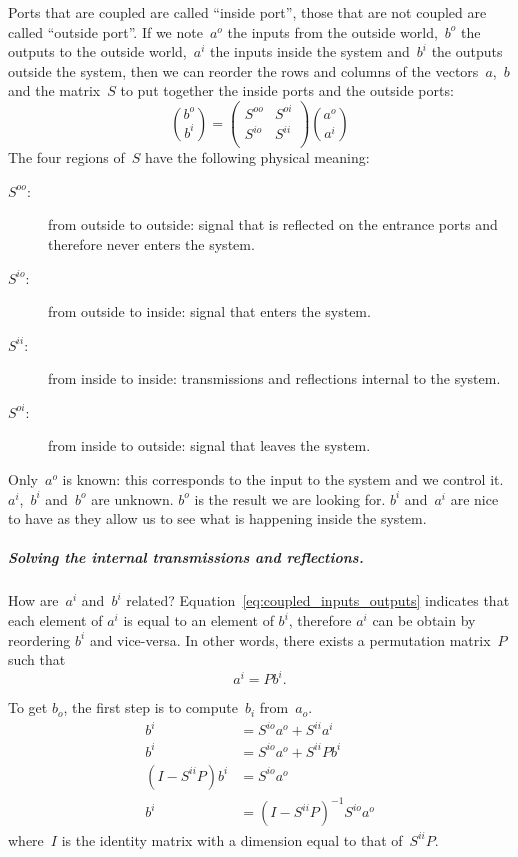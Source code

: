 Ports that are coupled are called ``inside port'', those that are not coupled are called ``outside port''.
If we note~$a^o$ the inputs from the outside world,~$b^o$ the outputs to the outside world,~$a^i$ the inputs inside the system and~$b^i$ the outputs outside the system, then we can reorder the rows and columns of the vectors~$a$,~$b$ and the matrix~$S$ to put together the inside ports and the outside ports: 
\begin{equation}
    \binom{b^o}{b^i} =
    \begin{pmatrix}
        S^{oo} & S^{oi} \\
        S^{io} & S^{ii} \\
    \end{pmatrix}
    \binom{a^o}{a^i}
    \label{eq:s_outside_inside}
\end{equation}
The four regions of~$S$ have the following physical meaning:
\begin{description}
    \item[$S^{oo}$:] from outside to outside: signal that is reflected on the entrance ports and therefore never enters the system.
    \item[$S^{io}$:] from outside to inside: signal that enters the system.
    \item[$S^{ii}$:] from inside to inside: transmissions and reflections internal to the system.
    \item[$S^{oi}$:] from inside to outside: signal that leaves the system.
\end{description}
Only~$a^o$ is known: this corresponds to the input to the system and we control it.
$a^i$,~$b^i$ and~$b^o$ are unknown.
$b^o$ is the result we are looking for.
$b^i$ and~$a^i$ are nice to have as they allow us to see what is happening inside the system.

\subparagraph{Solving the internal transmissions and reflections.}
How are~$a^i$ and~$b^i$ related?
Equation~\eqref{eq:coupled_inputs_outputs} indicates that each element of $a^i$ is equal to an element of $b^i$, therefore $a^i$ can be obtain by reordering $b^i$ and vice-versa.
In other words, there exists a permutation matrix~$P$ such that
\begin{equation}
    a^i = P b^i \text{.} \label{eq:relation_ai_bi}
\end{equation}

To get $b_o$, the first step is to compute~$b_i$ from~$a_o$.
\begin{subequations}
    \begin{align}
        b^i &= S^{io}a^o + S^{ii}a^i \label{eq:compute_bi_ai} \\
        b^i &= S^{io}a^o + S^{ii}Pb^i \label{eq:compute_bi_bi} \\
        (I - S^{ii}P)b^i &= S^{io}a^o \label{eq:compute_bi_solve} \\
        b^i &= (I - S^{ii}P)^{-1} S^{io}a^o \label{eq:compute_bi_invert}
    \end{align} \label{eq:compute_bi}
\end{subequations}
where~$I$ is the identity matrix with a dimension equal to that of~$S^{ii}P$.

